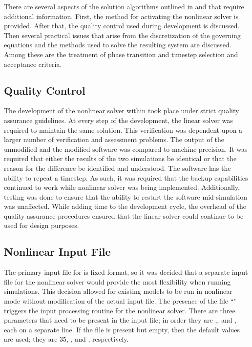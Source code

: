There are several aspects of the solution algorithms outlined in  and  that require additional information.
First, the method for activating the nonlinear solver is provided.
After that, the quality control used during development is discussed.
Then several practical issues that arise from the discretization of the governing equations and the methods used to solve the resulting system are discussed.
Among these are the treatment of phase transition and timestep selection and acceptance criteria.

\subsection{Quality Control}
\label{subsect:nlnDevelopment}
The development of the nonlinear solver within \cobra{} took place under strict quality assurance guidelines.
At every step of the development, the linear solver was required to maintain the same solution.
This verification was dependent upon a larger number of verification and assessment problems.
The output of the unmodified \cobra{} and the modified \cobra{} software was compared to machine precision.
It was required that either the results of the two simulations be identical or that the reason for the difference be identified and understood.
The \cobra{} software has the ability to repeat a timestep.
As such, it was required that the backup capabilities continued to work while nonlinear solver was being implemented.
Additionally, testing was done to ensure that the ability to restart the software mid-simulation was unaffected.
While adding time to the development cycle, the overhead of the quality assurance procedures ensured that the linear solver could continue to be used for design purposes.

\subsection{Nonlinear Input File}
\label{subsect:nlnCobraInputFile}
The primary input file for \cobra{} is fixed format, so it was decided that a separate input file for the nonlinear solver would provide the most flexibility when running simulations.
This decision allowed for existing models to be run in nonlinear mode without modification of the actual input file.
The presence of the file ``" triggers the input processing routine for the nonlinear solver.
There are three parameters that need to be present in the input file; in order they are \kmax{},\ftol{}, and \dtol{}, each on a separate line. 
If the file is present but empty, then the default values are used; they are $35$, , and , respectively.

